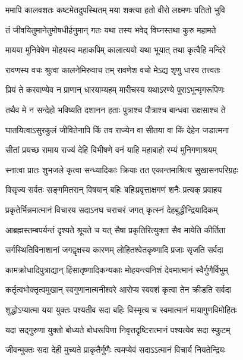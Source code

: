 \twolineshloka
{ममापि कालवशतः कष्टमेतदुपस्थितम्}
{मया शक्त्या हतो वीरो लक्ष्मणः पतितो भुवि} %

\twolineshloka
{तं जीवयितुमानेतुमोषधीर्हनुमान् गतः}
{यथा तस्य भवेद् विघ्नस्तथा कुरु महामते} %

\twolineshloka
{मायया मुनिवेषेण मोहयस्व महाकपिम्}
{कालात्ययो यथा भूयात् तथा कृत्वैहि मन्दिरे} %

\twolineshloka
{रावणस्य वचः श्रुत्वा कालनेमिरुवाच तम्}
{रावणेश वचो मेऽद्य शृणु धारय तत्त्वतः} %

\twolineshloka
{प्रियं ते करवाण्येव न प्राणान् धारयाम्यहम्}
{मारीचस्य यथाऽरण्ये पुराऽभून्मृगरूपिणः} %

\twolineshloka
{तथैव मे न सन्देहो भविष्यति दशानन}
{हताः पुत्राश्च पौत्राश्च बान्धवा राक्षसाश्च ते} %

\twolineshloka
{घातयित्वाऽसुरकुलं जीवितेनापि किं तव}
{राज्येन वा सीतया वा किं देहेन जडात्मना} %

\twolineshloka
{सीतां प्रयच्छ रामाय राज्यं देहि विभीषणे}
{वनं याहि महाबाहो रम्यं मुनिगणाश्रयम्} %

\twolineshloka
{स्नात्वा प्रातः शुभजले कृत्वा सन्ध्यादिकाः क्रियाः}
{तत एकान्तमाश्रित्य सुखासनपरिग्रहः} %

\twolineshloka
{विसृज्य सर्वतः सङ्गमितरान् विषयान् बहिः}
{बहिःप्रवृत्ताक्षगणं शनैः प्रत्यक् प्रवाहय} %

\twolineshloka
{प्रकृतेर्भिन्नमात्मानं विचारय सदाऽनघ}
{चराचरं जगत् कृत्स्नं देहबुद्धीन्द्रियादिकम्} %

\twolineshloka
{आब्रह्मस्तम्बपर्यन्तं दृश्यते श्रूयते च यत्}
{सैषा प्रकृतिरित्युक्ता सैव मायेति कीर्तिता} %

\twolineshloka
{सर्गस्थितिविनाशानां जगद्वृक्षस्य कारणम्}
{लोहितश्वेतकृष्णादि प्रजाः सृजति सर्वदा} %

\twolineshloka
{कामक्रोधादिपुत्राद्यान् हिंसातृष्णादिकन्यकाः}
{मोहयन्त्यनिशं देवमात्मानं स्वैर्गुणैर्विभुम्} %

\twolineshloka
{कर्तृत्वभोक्तृत्वमुखान् स्वगुणानात्मनीश्वरे}
{आरोप्य स्ववशं कृत्वा तेन क्रीडति सर्वदा} %

\twolineshloka
{शुद्धोऽप्यात्मा यया युक्तः पश्यतीव सदा बहिः}
{विस्मृत्य च स्वमात्मानं मायागुणविमोहितः} %

\twolineshloka
{यदा सद्गुरुणा युक्तो बोध्यते बोधरूपिणा}
{निवृत्तदृष्टिरात्मानं पश्यत्येव सदा स्फुटम्} %

\twolineshloka
{जीवन्मुक्तः सदा देही मुच्यते प्राकृतैर्गुणैः}
{त्वमप्येवं सदाऽऽत्मानं विचार्य नियतेन्द्रियः} %

